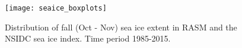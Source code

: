 

\begin{figure}
  \centering
  \texttt{[image: seaice\_boxplots]}
  \caption{Distribution of fall (Oct - Nov) sea ice extent in RASM and the NSIDC sea ice index. Time period 1985-2015.} %
  \label{fig:sea_ice_box}
\end{figure}

